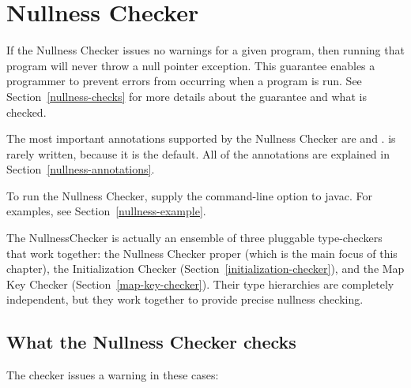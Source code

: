 \htmlhr
\chapter{Nullness Checker\label{nullness-checker}}

If the Nullness Checker issues no warnings for a given program, then
running that program will never throw a null pointer exception.  This
guarantee enables a programmer to prevent errors from occurring when a
program is run.  See Section~\ref{nullness-checks} for more details about
the guarantee and what is checked.

The most important annotations supported by the Nullness Checker are 
 and 
.
 is rarely written, because it is
the default.  All of the annotations are explained in
Section~\ref{nullness-annotations}.

To run the Nullness Checker, supply the
command-line option to javac.  For
examples, see Section~\ref{nullness-example}.

The NullnessChecker is actually an ensemble of three pluggable
type-checkers that work together: the Nullness Checker proper (which is the
main focus of this chapter), the Initialization Checker
(Section~\ref{initialization-checker}), and the Map Key Checker
(Section~\ref{map-key-checker}).
Their type hierarchies are completely independent, but they work together
to provide precise nullness checking.


\section{What the Nullness Checker checks\label{nullness-checks}}

The checker issues a warning in these cases:

